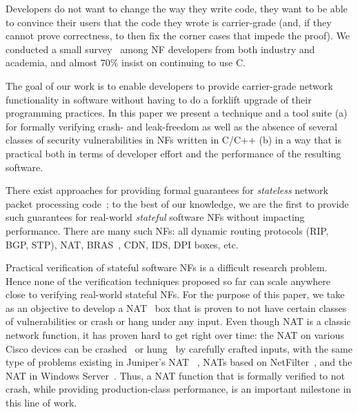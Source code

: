 \documentclass[letterpaper,twocolumn,10pt]{article}
\begin{document}
Developers do not want to change the way they write code, they want to be able
to convince their users that the code they wrote is carrier-grade (and, if they
cannot prove correctness, to then fix the corner cases that impede the proof).
We conducted a small survey~\cite{verifsurvey} among NF developers from both
industry and academia, and almost 70\% insist on continuing to use
C. %

The goal of our work is to enable developers to provide carrier-grade network
functionality in software without having to do a forklift upgrade of their
programming practices. In this paper we present a technique and a tool suite (a)
for formally verifying crash- and leak-freedom as well as the absence of several
classes of security vulnerabilities in NFs written in C/C++ (b) in a way that is
practical both in terms of developer effort and the performance of the resulting
software.

There exist approaches for providing formal guarantees for {\em stateless}
network packet processing code~\cite{dobrescu2014software}; to the best of our
knowledge, we are the first to provide such guarantees for real-world {\em
  stateful} software NFs without impacting performance. There are many such NFs:
all dynamic routing protocols (RIP, BGP, STP), NAT, BRAS~\cite{wiki:bras}, CDN,
IDS, DPI boxes, etc.

Practical verification of stateful software NFs is a difficult research problem.
Hence none of the verification techniques proposed so far can scale anywhere
close to verifying real-world stateful NFs. For the purpose of this paper, we
take as an objective to develop a NAT~\cite{rfc3022} box that is proven to not
have certain classes of vulnerabilities or crash or hang under any input. Even
though NAT is a classic network function, it has proven hard to get right over
time: the NAT on various Cisco devices can be crashed~\cite{cve-2015-6271} or
hung~\cite{cve-2013-1138} by carefully crafted inputs, with the same type of
problems existing in Juniper's NAT~ \cite{cve-2014-3817}, NATs based on
NetFilter~\cite{cve-2014-9715}, and the NAT in Windows Server~\cite{ms13-064}.
Thus, a NAT function that is formally verified to not crash, while providing
production-class performance, is an important milestone in this line of work.
\end{document}
